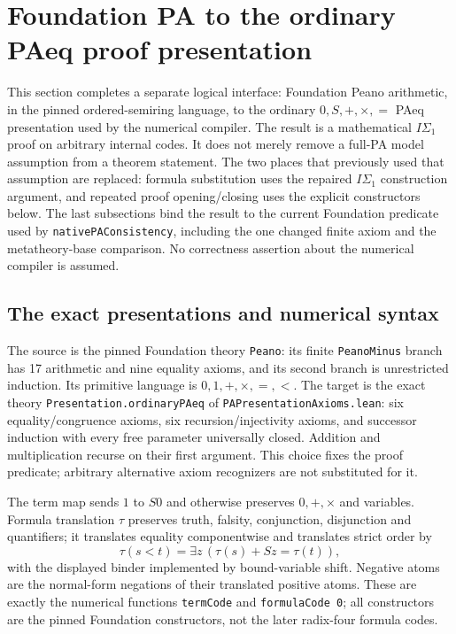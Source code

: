 \section{Foundation PA to the ordinary PAeq proof presentation}
\label{sec:foundation-paeq-complete}

This section completes a separate logical interface: Foundation
Peano arithmetic, in the pinned ordered-semiring language, to the ordinary
$0,S,+,\times,=$ PAeq presentation used by the numerical compiler.
The result is a mathematical $I\Sigma_1$ proof on arbitrary internal
codes.  It does not merely remove a full-PA model assumption from a theorem
statement.  The two places that previously used that assumption are
replaced: formula substitution uses the repaired $I\Sigma_1$ construction
argument, and repeated proof opening/closing uses the explicit constructors
below.  The last subsections bind the result to the current Foundation
predicate used by \texttt{nativePAConsistency}, including the one changed
finite axiom and the metatheory-base comparison.  No correctness assertion
about the numerical compiler is assumed.

\subsection{The exact presentations and numerical syntax}

The source is the pinned Foundation theory \texttt{Peano}: its finite
\texttt{PeanoMinus} branch has 17 arithmetic and nine equality axioms,
and its second branch is unrestricted induction.  Its primitive language
is $0,1,+,\times,=,<$.  The target is the exact theory
\texttt{Presentation.ordinaryPAeq} of
\texttt{PAPresentationAxioms.lean}: six equality/congruence axioms,
six recursion/injectivity axioms, and successor induction with every free
parameter universally closed.  Addition and multiplication recurse on
their first argument.  This choice fixes the proof predicate; arbitrary
alternative axiom recognizers are not substituted for it.

The term map sends $1$ to $S0$ and otherwise preserves $0,+,\times$ and
variables.  Formula translation $\tau$ preserves truth, falsity,
conjunction, disjunction and quantifiers; it translates equality
componentwise and translates strict order by
\[
 \tau(s<t)=\exists z\,(\tau(s)+S z=\tau(t)),
\]
with the displayed binder implemented by bound-variable shift.
Negative atoms are the normal-form negations of their translated positive
atoms.  These are exactly the numerical functions \texttt{termCode} and
\texttt{formulaCode 0}; all constructors are the pinned Foundation
constructors, not the later radix-four formula codes.


